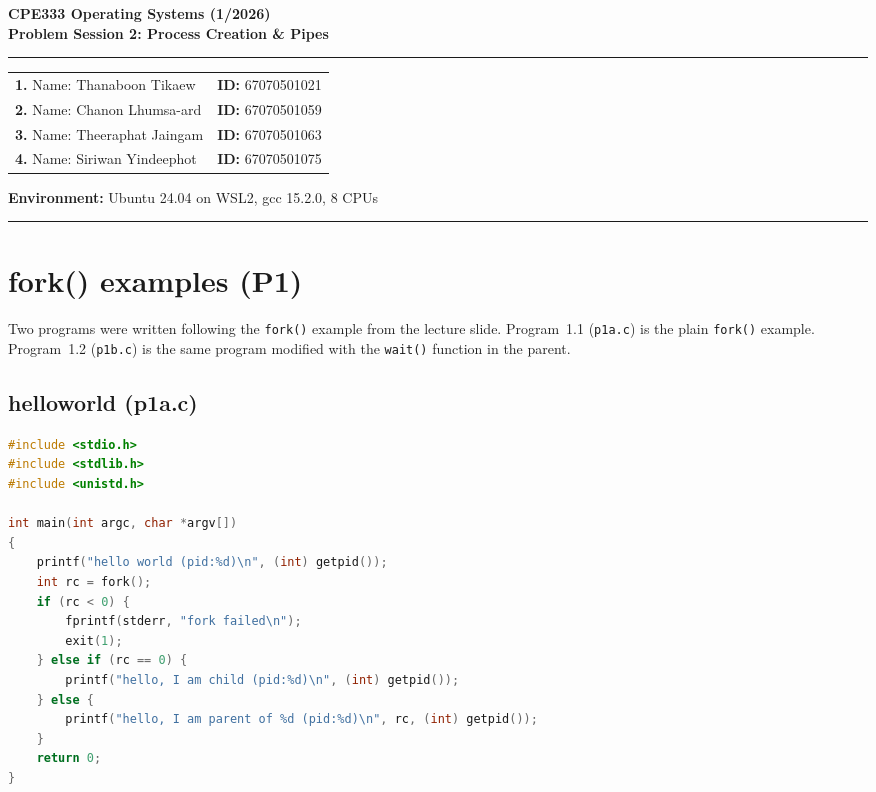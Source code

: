 \documentclass[11pt,a4paper]{article}
\begin{document}
\begin{center}
    {\LARGE \textbf{CPE333 Operating Systems (1/2026)}}\\[4pt]
    {\Large \textbf{Problem Session 2: Process Creation \& Pipes}}\\[8pt]
    \rule{\textwidth}{0.8pt}
\end{center}

\vspace{-0.5em}
\noindent
\begin{tabular*}{\textwidth}{@{\extracolsep{\fill}}ll}
    \textbf{1.} Name: Thanaboon Tikaew & \textbf{ID:} 67070501021 \\[3pt]
    \textbf{2.} Name: Chanon Lhumsa-ard & \textbf{ID:} 67070501059 \\[3pt]
    \textbf{3.} Name: Theeraphat Jaingam & \textbf{ID:} 67070501063 \\[3pt]
    \textbf{4.} Name: Siriwan Yindeephot & \textbf{ID:} 67070501075 \\[4pt]
\end{tabular*}

\vspace{2pt}
\noindent\textbf{Environment:} Ubuntu 24.04 on WSL2, gcc 15.2.0, 8 CPUs\\[-4pt]
\rule{\textwidth}{0.8pt}

\vspace{0.5em}

\section{fork() examples (P1)}

Two programs were written following the \texttt{fork()} example from the lecture slide. Program~1.1 (\texttt{p1a.c}) is the plain \texttt{fork()} example. Program~1.2 (\texttt{p1b.c}) is the same program modified with the \texttt{wait()} function in the parent.

\subsection{helloworld (p1a.c)}

\begin{lstlisting}[language=C]
#include <stdio.h>
#include <stdlib.h>
#include <unistd.h>

int main(int argc, char *argv[])
{
    printf("hello world (pid:%d)\n", (int) getpid());
    int rc = fork();
    if (rc < 0) {
        fprintf(stderr, "fork failed\n");
        exit(1);
    } else if (rc == 0) {
        printf("hello, I am child (pid:%d)\n", (int) getpid());
    } else {
        printf("hello, I am parent of %d (pid:%d)\n", rc, (int) getpid());
    }
    return 0;
}
\end{lstlisting}
\end{document}

